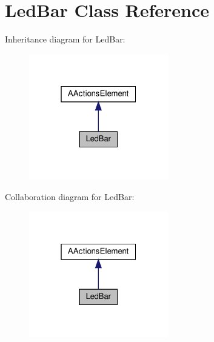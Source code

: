 \hypertarget{classLedBar}{}\section{Led\+Bar Class Reference}
\label{classLedBar}


Inheritance diagram for Led\+Bar\+:
\nopagebreak
\begin{figure}[H]
\begin{center}
\leavevmode
\includegraphics[width=172pt]{classLedBar__inherit__graph}
\end{center}
\end{figure}


Collaboration diagram for Led\+Bar\+:
\nopagebreak
\begin{figure}[H]
\begin{center}
\leavevmode
\includegraphics[width=172pt]{classLedBar__coll__graph}
\end{center}
\end{figure}
